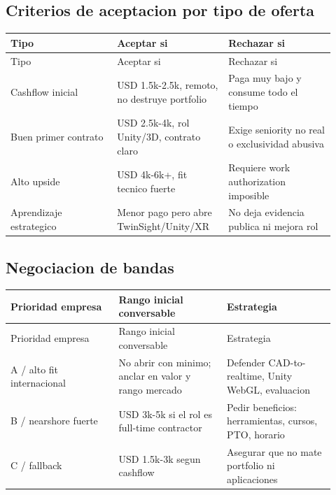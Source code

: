 \subsection{Criterios de aceptacion por tipo de oferta}


\begin{center}
\scriptsize
\begin{longtable}{>{\raggedright\arraybackslash}p{0.305\linewidth} >{\raggedright\arraybackslash}p{0.305\linewidth} >{\raggedright\arraybackslash}p{0.305\linewidth}}
\toprule
Tipo & Aceptar si & Rechazar si \\
\midrule
\endfirsthead
\toprule
Tipo & Aceptar si & Rechazar si \\
\midrule
\endhead
Cashflow inicial & USD 1.5k-2.5k, remoto, no destruye portfolio & Paga muy bajo y consume todo el tiempo \\
Buen primer contrato & USD 2.5k-4k, rol Unity/3D, contrato claro & Exige seniority no real o exclusividad abusiva \\
Alto upside & USD 4k-6k+, fit tecnico fuerte & Requiere work authorization imposible \\
Aprendizaje estrategico & Menor pago pero abre TwinSight/Unity/XR & No deja evidencia publica ni mejora rol \\
\bottomrule
\end{longtable}
\end{center}


\subsection{Negociacion de bandas}


\begin{center}
\scriptsize
\begin{longtable}{>{\raggedright\arraybackslash}p{0.305\linewidth} >{\raggedright\arraybackslash}p{0.305\linewidth} >{\raggedright\arraybackslash}p{0.305\linewidth}}
\toprule
Prioridad empresa & Rango inicial conversable & Estrategia \\
\midrule
\endfirsthead
\toprule
Prioridad empresa & Rango inicial conversable & Estrategia \\
\midrule
\endhead
A / alto fit internacional & No abrir con minimo; anclar en valor y rango mercado & Defender CAD-to-realtime, Unity WebGL, evaluacion \\
B / nearshore fuerte & USD 3k-5k si el rol es full-time contractor & Pedir beneficios: herramientas, cursos, PTO, horario \\
C / fallback & USD 1.5k-3k segun cashflow & Asegurar que no mate portfolio ni aplicaciones \\
\bottomrule
\end{longtable}
\end{center}


